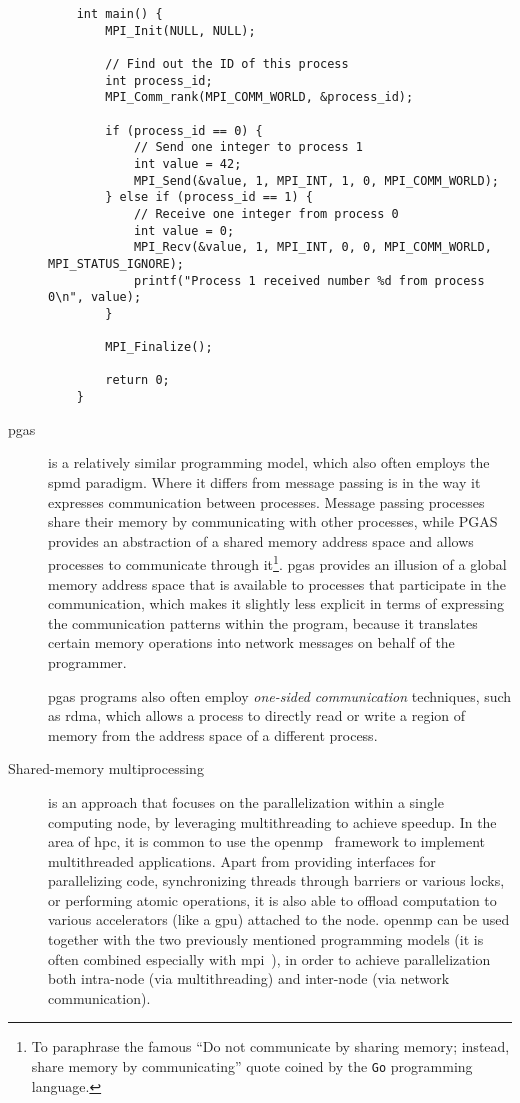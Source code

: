 \begin{description}
\begin{listing}[h]
\begin{verbatim}
	int main() {
		MPI_Init(NULL, NULL);

		// Find out the ID of this process
		int process_id;
		MPI_Comm_rank(MPI_COMM_WORLD, &process_id);

		if (process_id == 0) {
			// Send one integer to process 1
			int value = 42;
			MPI_Send(&value, 1, MPI_INT, 1, 0, MPI_COMM_WORLD);
		} else if (process_id == 1) {
			// Receive one integer from process 0
			int value = 0;
			MPI_Recv(&value, 1, MPI_INT, 0, 0, MPI_COMM_WORLD, MPI_STATUS_IGNORE);
			printf("Process 1 received number %d from process 0\n", value);
		}

		MPI_Finalize();

		return 0;
	}
				  \end{verbatim}
		\end{listing}

	\item[\gls{pgas}~\cite{pgas}] is a relatively similar programming model, which also often employs the \gls{spmd}
		paradigm. Where it differs from message passing is in the way it expresses communication between
		processes. Message passing processes share their memory by communicating with other processes,
		while PGAS provides an abstraction of a shared memory address space and allows processes to
		communicate through it\footnote{To paraphrase the famous ``Do not communicate by sharing memory; instead, share memory by communicating'' quote coined by the \texttt{Go} programming language.}. \gls{pgas} provides an illusion of a
		global memory address space that is available to processes that participate in the communication,
		which makes it slightly less explicit in terms of expressing the communication patterns within the
		program, because it translates certain memory operations into network messages on behalf of the
		programmer.

		\gls{pgas} programs also often employ \emph{one-sided communication} techniques, such as
		\gls{rdma}, which allows a process to directly read or write a region of memory from
		the address space of a different process.

	\item[Shared-memory multiprocessing] is an approach that focuses on the parallelization within a single computing node, by leveraging
		multithreading to achieve speedup. In the area of \gls{hpc}, it is common to use the
		\gls{openmp}~\cite{openmp} framework to implement multithreaded applications.
		Apart from providing interfaces for parallelizing code, synchronizing threads through barriers or
		various locks, or performing atomic operations, it is also able to offload computation to various
		accelerators (like a \gls{gpu}) attached to the node. \gls{openmp} can be
		used together with the two previously mentioned programming models (it is often combined especially
		with \gls{mpi}~\cite{hybrid_openmp_mpi}), in order to achieve parallelization both
		intra-node (via multithreading) and inter-node (via network communication).


\end{description}
